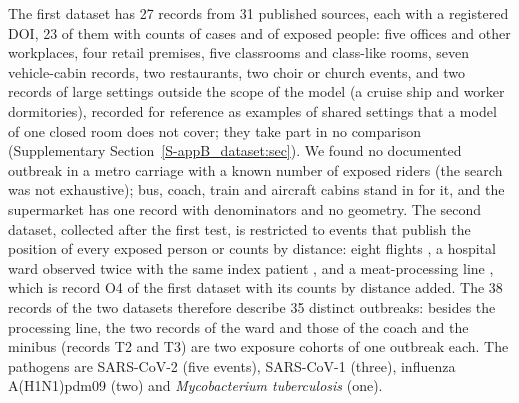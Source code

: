 The first dataset has 27 records from 31 published sources, each with a registered DOI, 23 of them with counts
of cases and of exposed people: five offices and other workplaces, four retail premises, five classrooms and
class-like rooms, seven vehicle-cabin records, two restaurants, two choir or church events, and two records of
large settings outside the scope of the model (a cruise ship and worker dormitories), recorded for reference as
examples of shared settings that a model of one closed room does not cover; they take part in no comparison
(Supplementary Section~\ref{S-appB_dataset:sec}). We found no documented outbreak in a metro carriage
with a known number of exposed riders (the search was not exhaustive); bus, coach, train and aircraft cabins
stand in for it, and the supermarket has one record with denominators and no geometry.
The second dataset, collected after the first test, is restricted to events that publish the position of every
exposed person or counts by distance: eight flights
\citep{olsen2003transmission,kenyon1996transmission,baker2010transmission,young2014international,toyokawa2022transmission,speake2020flight,swadi2021genomic,hoehl2020assessment},
a hospital ward observed twice with the same index patient \citep{wong2004cluster,yu2005temporal}, and a
meat-processing line \citep{guenther2020}, which is record O4 of the first dataset with its counts by distance
added. The 38 records of the two datasets therefore describe 35 distinct outbreaks: besides the processing line,
the two records of the ward and those of the coach and the minibus (records T2 and T3) are two exposure cohorts
of one outbreak each.
The pathogens are SARS-CoV-2 (five events), SARS-CoV-1 (three),
influenza A(H1N1)pdm09 (two) and \emph{Mycobacterium tuberculosis} (one).

